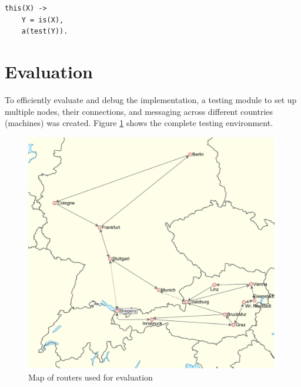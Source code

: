 \documentclass[a4paper, 11pt]{article}
\begin{document}
\begin{verbatim}
this(X) ->
    Y = is(X),
    a(test(Y)).
\end{verbatim}

\section{Evaluation}

To efficiently evaluate and debug the implementation, a testing module to set up multiple nodes, their connections, and messaging across different countries (machines) was created.
Figure \ref{fig:map1} shows the complete testing environment.

\begin{figure}[H]
  \begin{center}
    \includegraphics[width=\textwidth]{graphics/map_routy.pdf}
    \caption{Map of routers used for evaluation}
    \label{fig:map1}
  \end{center}
\end{figure}


\end{document}
